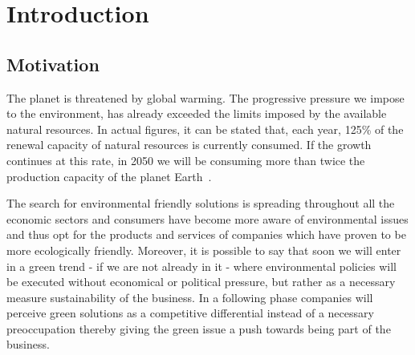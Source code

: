 


\chapter{Introduction} \label{chap1:introduction}



\section{Motivation} \label{sec1:motivation}

    The planet is threatened by global warming. The progressive pressure we impose to the environment, has already exceeded the limits imposed by the available natural resources. In actual figures, it can be stated that, each year, 125\% of the renewal capacity of natural resources is currently consumed. If the growth continues at this rate, in 2050 we will be consuming more than twice the production capacity of the planet Earth~\cite{Townsend:2002:2050}. 
    
    The search for environmental friendly solutions is spreading throughout all the economic sectors and consumers have become more aware of environmental issues and thus opt for the products and services of companies which have proven to be more ecologically friendly. Moreover, it is possible to say that soon we will enter in a green trend - if we are not already in it - where environmental policies will be executed without economical or political pressure, but rather as a necessary measure sustainability of the business. In a following phase companies will perceive green solutions as a competitive differential instead of a necessary preoccupation thereby giving the green issue a push towards being part of the business.
        
